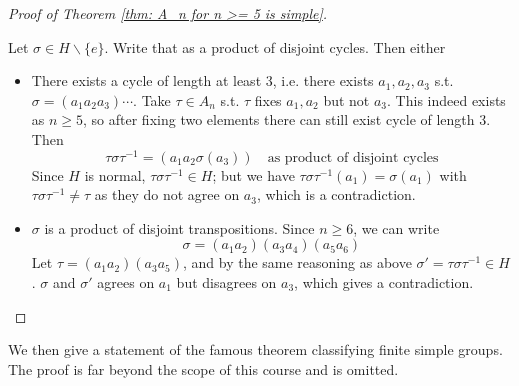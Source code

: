 \begin{proof}[Proof of Theorem \ref{thm: A_n for n >= 5 is simple}]
\begin{itemize}
\begin{itemize}
            Let $\sigma \in H \smallsetminus \{e\}$. Write that as a product of disjoint cycles. Then either
            \begin{itemize}
                \item There exists a cycle of length at least 3, i.e. there exists $a_1, a_2, a_3$ s.t. $\sigma = (a_1 a_2 a_3) \cdots$. Take $\tau \in A_n$ s.t. $\tau$ fixes $a_1, a_2$ but not $a_3$. This indeed exists as $n \geq 5$, so after fixing two elements there can still exist cycle of length 3. Then
                \[
                    \tau \sigma \tau^{-1} = (a_1 a_2 \sigma(a_3)) \quad \text{as product of disjoint cycles}
                \]
                Since $H$ is normal, $\tau \sigma \tau^{-1} \in H$; but we have $\tau \sigma \tau^{-1}(a_1) = \sigma(a_1)$ with $\tau \sigma \tau^{-1} \neq \tau$ as they do not agree on $a_3$, which is a contradiction.
                \item $\sigma$ is a product of disjoint transpositions. Since $n \geq 6$, we can write
                \[
                    \sigma = (a_1 a_2)(a_3 a_4)(a_5 a_6)
                \]
                Let $\tau = (a_1 a_2)(a_3 a_5)$, and by the same reasoning as above $\sigma' = \tau \sigma \tau^{-1} \in H$. $\sigma$ and $\sigma'$ agrees on $a_1$ but disagrees on $a_3$, which gives a contradiction.
            \end{itemize}
        \end{itemize}
    \end{itemize}
\end{proof}

\textstart
We then give a statement of the famous theorem classifying finite simple groups. The proof is far beyond the scope of this course and is omitted.

